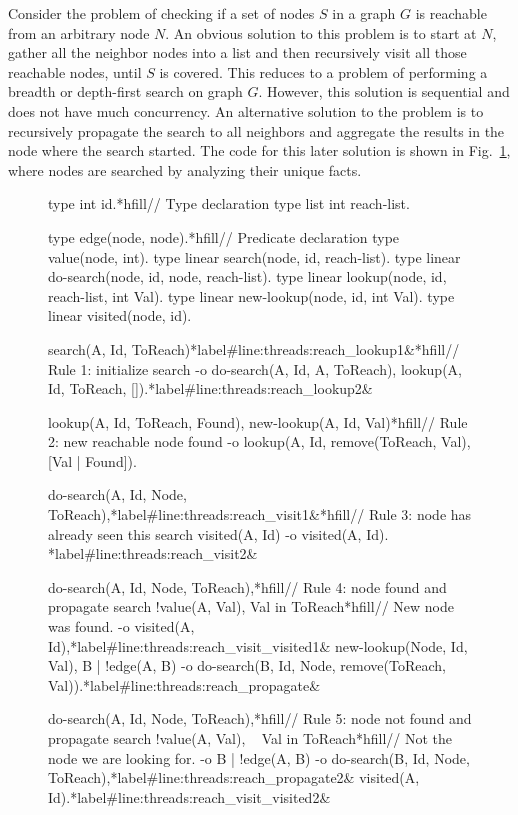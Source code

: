 Consider the problem of checking if a set of nodes $S$ in a graph $G$ is
reachable from an arbitrary node $N$. An obvious solution to this problem is to
start at $N$, gather all the neighbor nodes into a list and then recursively
visit all those reachable nodes, until $S$ is covered. This reduces to a problem
of performing a breadth or depth-first search on graph $G$. However, this
solution is sequential and does not have much concurrency.  An alternative
solution to the problem is to recursively propagate the search to all neighbors
and aggregate the results in the node where the search started.  The code for
this later solution is shown in Fig.~\ref{code:threads:reach_simple}, where
nodes are searched by analyzing their unique  facts.

\begin{figure}[h]
\begin{LineCode}[commandchars=*\#\&]
type int id.*hfill// Type declaration
type list int reach-list.

type edge(node, node).*hfill// Predicate declaration
type value(node, int).
type linear search(node, id, reach-list).
type linear do-search(node, id, node, reach-list).
type linear lookup(node, id, reach-list, int Val).
type linear new-lookup(node, id, int Val).
type linear visited(node, id).

search(A, Id, ToReach)*label#line:threads:reach_lookup1&*hfill// Rule 1: initialize search
   -o do-search(A, Id, A, ToReach),
      lookup(A, Id, ToReach, []).*label#line:threads:reach_lookup2&

lookup(A, Id, ToReach, Found), new-lookup(A, Id, Val)*hfill// Rule 2: new reachable node found
   -o lookup(A, Id, remove(ToReach, Val), [Val | Found]).

do-search(A, Id, Node, ToReach),*label#line:threads:reach_visit1&*hfill// Rule 3: node has already seen this search
visited(A, Id)
   -o visited(A, Id). *label#line:threads:reach_visit2&

do-search(A, Id, Node, ToReach),*hfill// Rule 4: node found and propagate search
!value(A, Val), Val in ToReach*hfill// New node was found.
   -o visited(A, Id),*label#line:threads:reach_visit_visited1&
      new-lookup(Node, Id, Val),
      {B | !edge(A, B) -o do-search(B, Id, Node, remove(ToReach, Val))}.*label#line:threads:reach_propagate&

do-search(A, Id, Node, ToReach),*hfill// Rule 5: node not found and propagate search
!value(A, Val), ~ Val in ToReach*hfill// Not the node we are looking for.
   -o {B | !edge(A, B) -o do-search(B, Id, Node, ToReach)},*label#line:threads:reach_propagate2&
      visited(A, Id).*label#line:threads:reach_visit_visited2&
\end{LineCode}

\label{code:threads:reach_simple}
\end{figure}

